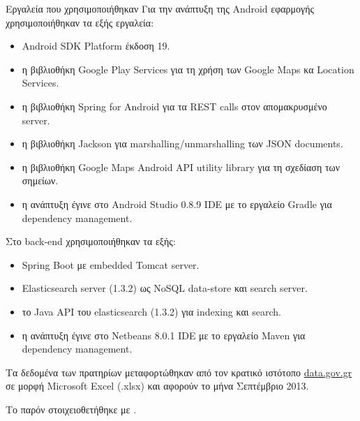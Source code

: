 \begin{section}{Εργαλεία που χρησιμοποιήθηκαν}
\bigskip
Για την ανάπτυξη της Android εφαρμογής χρησιμοποιήθηκαν τα εξής εργαλεία:
\begin{itemize}
\item Android SDK Platform έκδοση 19.
\item η βιβλιοθήκη Google Play Services για τη χρήση των Google Maps κα Location Services.
\item η βιβλιοθήκη Spring for Android για τα REST calls στον απομακρυσμένο server. \cite{spring_and_proj}
\item η βιβλιοθήκη Jackson για marshalling/unmarshalling των JSON documents. \cite{jackson}
\item η βιβλιοθήκη Google Maps Android API utility library για τη σχεδίαση των σημείων. \cite{map_utils}
\item η ανάπτυξη έγινε στο Android Studio 0.8.9 IDE με το εργαλείο Gradle για dependency management.
\end{itemize}

Στο back-end χρησιμοποιήθηκαν τα εξής:
\begin{itemize}
\item Spring Boot με embedded Tomcat server. \cite{spring_boot_proj}
\item Elasticsearch server (1.3.2) ως NoSQL data-store και search server. \cite{es_home}
\item το Java API του elasticsearch (1.3.2) για indexing και search. \cite{es_java}
\item η ανάπτυξη έγινε στο Netbeans 8.0.1 IDE με το εργαλείο Maven για dependency management.
\end{itemize}

Τα δεδομένα των πρατηρίων μεταφορτώθηκαν από τον κρατικό ιστότοπο \url{data.gov.gr} σε μορφή Microsoft Excel (.xlsx) και αφορούν το μήνα Σεπτέμβριο 2013.

Το παρόν στοιχειοθετήθηκε με \XeLaTeX.

\end{section}
